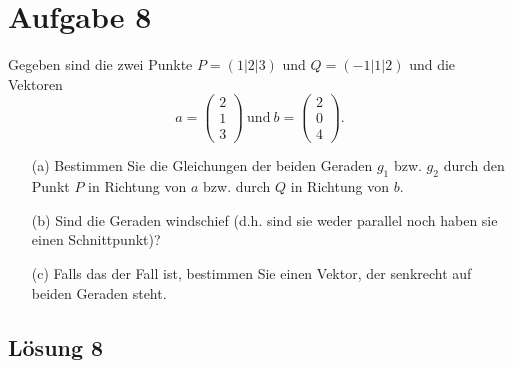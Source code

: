 \documentclass[main.tex]{subfiles}
\begin{document}
\section{Aufgabe 8}
Gegeben sind die zwei Punkte $ P=( 1|2|3)$ und $ Q=( -1|1|2)$ und die Vektoren
\begin{equation*}
    a=\begin{pmatrix}
    2\\
    1\\
    3
    \end{pmatrix} \ \text{und} \ b=\begin{pmatrix}
    2\\
    0\\
    4
    \end{pmatrix}\text{.}
\end{equation*}

\begin{enumerate}
    \item[(a)] Bestimmen Sie die Gleichungen der beiden Geraden $g_{1}$ bzw. $g_{2}$ durch den Punkt $P$ in Richtung von $a$ bzw. durch $Q$ in Richtung von $b$.
    \item[(b)] Sind die Geraden windschief (d.h. sind sie weder parallel noch haben sie einen Schnittpunkt)?
    \item[(c)] Falls das der Fall ist, bestimmen Sie einen Vektor, der senkrecht auf beiden Geraden steht.
\end{enumerate}

\subsection{Lösung 8}
\end{document}
